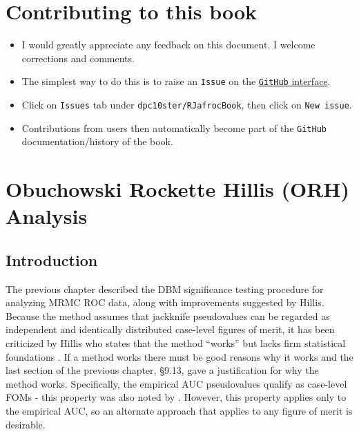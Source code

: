 \documentclass[
]{book}
\providecommand{\tightlist}{%
  \setlength{\itemsep}{0pt}\setlength{\parskip}{0pt}}
\begin{document}
\hypertarget{contributing-to-this-book}{%
\chapter*{Contributing to this book}\label{contributing-to-this-book}}

\begin{itemize}
\tightlist
\item
  I would greatly appreciate any feedback on this document. I welcome corrections and comments.\\
\item
  The simplest way to do this is to raise an \texttt{Issue} on the \href{https://github.com/dpc10ster/RJafrocBook}{\texttt{GitHub} interface}.
\item
  Click on \texttt{Issues} tab under \texttt{dpc10ster/RJafrocBook}, then click on \texttt{New\ issue}.
\item
  Contributions from users then automatically become part of the \texttt{GitHub} documentation/history of the book.
\end{itemize}

\hypertarget{ORHAnalysis}{%
\chapter{Obuchowski Rockette Hillis (ORH) Analysis}\label{ORHAnalysis}}

\hypertarget{introduction}{%
\section{Introduction}\label{introduction}}

The previous chapter described the DBM significance testing procedure \citep{RN204} for analyzing MRMC ROC data, along with improvements suggested by Hillis. Because the method assumes that jackknife pseudovalues can be regarded as independent and identically distributed case-level figures of merit, it has been criticized by Hillis who states that the method ``works'' but lacks firm statistical foundations \citep{RN1772, RN1865, RN1866}. If a method works there must be good reasons why it works and the last section of the previous chapter, §9.13, gave a justification for why the method works. Specifically, the empirical AUC pseudovalues qualify as case-level FOMs - this property was also noted by \citep{RN1395}. However, this property applies only to the empirical AUC, so an alternate approach that applies to any figure of merit is desirable.
\end{document}
